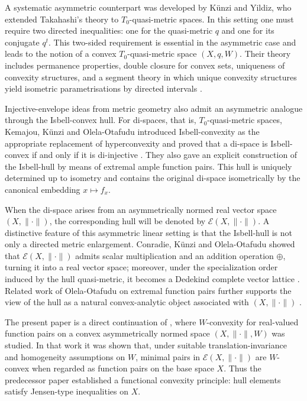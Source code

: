 \documentclass[preprint,12pt]{elsarticle}
\numberwithin{equation}{section}
\newcommand{\E}{\mathcal{E}}
\begin{document}
A systematic asymmetric counterpart was developed by K\"unzi and Yildiz, who
extended Takahashi's theory to \(T_{0}\)-quasi-metric spaces.  In this setting
one must require two directed inequalities: one for the quasi-metric \(q\) and
one for its conjugate \(q^{t}\).  This two-sided requirement is essential in
the asymmetric case and leads to the notion of a convex
\(T_{0}\)-quasi-metric space \((X,q,W)\).  Their theory includes permanence
properties, double closure for convex sets, uniqueness of convexity structures,
and a segment theory in which unique convexity structures yield isometric
parametrisations by directed intervals \cite{KunziYildiz2016}.

Injective-envelope ideas from metric geometry also admit an asymmetric
analogue through the Isbell-convex hull.  For di-spaces, that is,
\(T_{0}\)-quasi-metric spaces, Kemajou, K\"unzi and Olela-Otafudu introduced
Isbell-convexity as the appropriate replacement of hyperconvexity and proved
that a di-space is Isbell-convex if and only if it is di-injective
\cite{KemajouKunziOlela2012}.  They also gave an explicit construction of the
Isbell-hull by means of extremal ample function pairs.  This hull is uniquely
determined up to isometry and contains the original di-space isometrically by
the canonical embedding \(x\mapsto f_x\).

When the di-space arises from an asymmetrically normed real vector space
\((X,\|\cdot\|)\), the corresponding hull will be denoted by
\(\E(X,\|\cdot\|)\).  A distinctive feature of this asymmetric linear setting
is that the Isbell-hull is not only a directed metric enlargement.  Conradie,
K\"unzi and Olela-Otafudu showed that \(\E(X,\|\cdot\|)\) admits scalar
multiplication and an addition operation \(\oplus\), turning it into a real
vector space; moreover, under the specialization order induced by the hull
quasi-metric, it becomes a Dedekind complete vector lattice
\cite{ConradieKunziOlela2017}.  Related work of Olela-Otafudu on extremal
function pairs further supports the view of the hull as a natural
convex-analytic object associated with \((X,\|\cdot\|)\) \cite{Olela2014}.

The present paper is a direct continuation of \cite{OlelaZweni2023}, where
\(W\)-convexity for real-valued function pairs on a convex asymmetrically
normed space \((X,\|\cdot\|,W)\) was studied.  In that work it was shown that,
under suitable translation-invariance and homogeneity assumptions on \(W\),
minimal pairs in \(\E(X,\|\cdot\|)\) are \(W\)-convex when regarded as
function pairs on the base space \(X\).  Thus the predecessor paper established
a functional convexity principle: hull elements satisfy Jensen-type
inequalities on \(X\).
\end{document}
